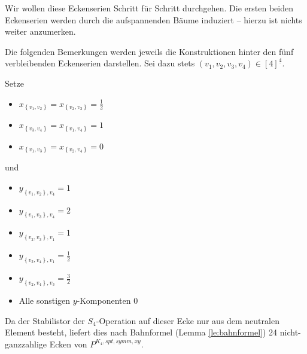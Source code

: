 \documentclass[10p,a4paper,BCOR = 12mm, DIV=15]{scrbook}
\begin{document}
Wir wollen diese Eckenserien Schritt für Schritt durchgehen. Die ersten beiden Eckenserien werden durch die aufspannenden Bäume induziert -- hierzu ist nichts weiter anzumerken.

Die folgenden Bemerkungen werden jeweils die Konstruktionen hinter den fünf verbleibenden Eckenserien darstellen. Sei dazu stets $\left(v_1, v_2, v_3, v_4\right) \in \left[4\right]^{\underline{4}}$.

\begin{Bem}
Setze
\begin{itemize}
\item $x_{\left\{v_1, v_2\right\}} = x_{\left\{v_2, v_3\right\}} = \frac{1}{2}$
\item $x_{\left\{v_3, v_4\right\}} = x_{\left\{v_1, v_4\right\}} = 1$
\item $x_{\left\{v_1, v_3\right\}} = x_{\left\{v_2, v_4\right\}} = 0$
\end{itemize}
und
\begin{itemize}
\item $y_{\left\{v_1, v_2\right\}, v_4} = 1$
\item $y_{\left\{v_1, v_3\right\}, v_4} = 2$
\item $y_{\left\{v_2, v_3\right\}, v_1} = 1$
\item $y_{\left\{v_2, v_4\right\}, v_1} = \frac{1}{2}$
\item $y_{\left\{v_2, v_4\right\}, v_3} = \frac{3}{2}$
\item Alle sonstigen $y$-Komponenten $0$
\end{itemize}

Da der Stabilistor der $S_4$-Operation auf dieser Ecke nur aus dem neutralen Element besteht, liefert dies nach Bahnformel (Lemma \ref{le:bahnformel}) 24 nicht-ganzzahlige Ecken von $P^{K_4, spt, symm, xy}$.
\end{Bem}
\end{document}
